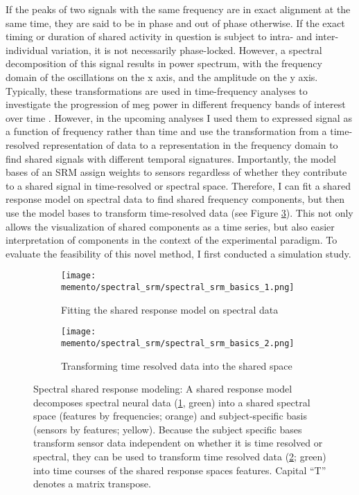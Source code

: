 If the peaks of two signals with the same frequency are in exact alignment at the same time, they are said to be in phase and out of phase otherwise.
If the exact timing or duration of shared activity in question is subject to intra- and inter-individual variation, it is not necessarily phase-locked.
However, a spectral decomposition of this signal results in power spectrum, with the frequency domain of the oscillations on the x axis, and the amplitude on the y axis.
Typically, these transformations are used in time-frequency analyses to investigate the progression of \gls{meg} power in different frequency bands of interest over time \citep{hari2017primer}.
However, in the upcoming analyses I used them to expressed signal as a function of frequency rather than time and use the transformation from a time-resolved representation of data to a representation in the frequency domain to find shared signals with different temporal signatures.
Importantly, the model bases of an \gls{SRM} assign weights to sensors regardless of whether they contribute to a shared signal in time-resolved or spectral space.
Therefore, I can fit a shared response model on spectral data to find shared frequency components, but then use the model bases to transform time-resolved data (see Figure \ref{fig:spectral-srm}).
This not only allows the visualization of shared components as a time series, but also easier interpretation of components in the context of the experimental paradigm.
To evaluate the feasibility of this novel method, I first conducted a simulation study.

\begin{figure}
	\centering
	\begin{subfigure}{0.9\textwidth}
		\texttt{[image: memento/spectral\_srm/spectral\_srm\_basics\_1.png]}
		\caption{Fitting the shared response model on spectral data}
		\label{fig:spectral-srm1}
	\end{subfigure}
	\begin{subfigure}{0.9\textwidth}
		\texttt{[image: memento/spectral\_srm/spectral\_srm\_basics\_2.png]}
		\caption{Transforming time resolved data into the shared space}
		\label{fig:spectral-srm2}
	\end{subfigure}
	\caption[Spectral shared response modeling]{Spectral shared response modeling: A shared response model decomposes spectral neural data (\ref{fig:spectral-srm1}, green) into a shared spectral space (features by frequencies; orange) and subject-specific basis (sensors by features; yellow). Because the subject specific bases transform sensor data independent on whether it is time resolved or spectral, they can be used to transform time resolved data (\ref{fig:spectral-srm2}; green) into time courses of the shared response spaces features. Capital ``T'' denotes a matrix transpose.}
	\label{fig:spectral-srm}
\end{figure}

